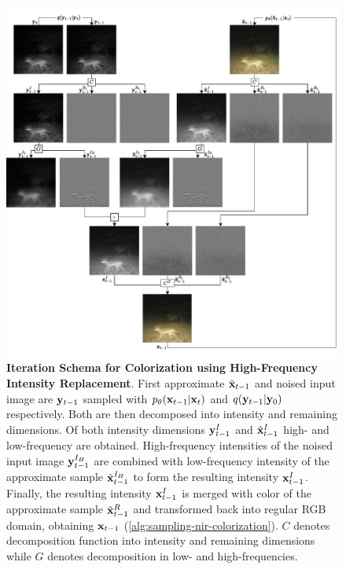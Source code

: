 \begin{figure}
   \includegraphics[width=\textwidth]{gfx/NIR-Colorization-Sampling.pdf}
   \caption{
      \textbf{Iteration Schema for Colorization using High-Frequency Intensity Replacement}.
      First approximate $\tilde{\mathbf{x}}_{t-1}$ and noised input image are $\mathbf{y}_{t-1}$ sampled with $p_\theta(\mathbf{x}_{t-1}|\mathbf{x}_t)$ and $q(\mathbf{y}_{t-1}|\mathbf{y}_0)$ respectively.
      Both are then decomposed into intensity and remaining dimensions. 
      Of both intensity dimensions $\mathbf{y}_{t-1}^I$ and $\tilde{\mathbf{x}}_{t-1}^I$ high- and low-frequency are obtained.  
      High-frequency intensities of the noised input image $\mathbf{y}_{t-1}^{I_H}$ are combined with low-frequency intensity of the approximate sample $\tilde{\mathbf{x}}_{t-1}^{I_H}$ to form the resulting intensity $\mathbf{x}_{t-1}^{I}$.
      Finally, the resulting intensity $\mathbf{x}_{t-1}^{I}$ is merged with color of the approximate sample $\tilde{\mathbf{x}}_{t-1}^R$ and transformed back into regular RGB domain, obtaining $\mathbf{x}_{t-1}$ (\autoref{alg:sampling-nir-colorization}).
      $C$ denotes decomposition function into intensity and remaining dimensions while $G$ denotes decomposition in low- and high-frequencies.
   }
   \label{fig:sampling-nir-colorization}
\end{figure}


